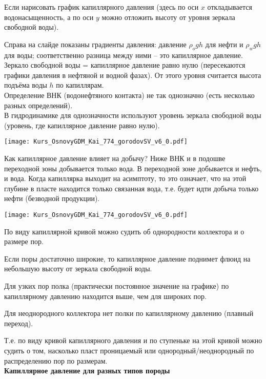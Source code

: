 Если нарисовать график капиллярного давления (здесь по оси $x$ откладывается водонасыщенность, а по оси $y$ можно отложить высоту от уровня зеркала свободной воды).

Справа на слайде показаны градиенты давления: давление $\rho_{o} g h$ для нефти и $\rho_{w} g h$ для воды; соответственно разница между ними -- это капиллярное давление.
\\

Зеркало свободной воды = капиллярное давление равно нулю (пересекаются графики давления в нефтяной и водной фазах).
От этого уровня считается высота подъёма воды $h$ по капиллярам.
\\

Определение ВНК (водонефтяного контакта) не так однозначно (есть несколько разных определений).
\\

В гидродинамике для однозначности используют уровень зеркала свободной воды (уровень, где капиллярное давление равно нулю).

\texttt{[image: Kurs\_OsnovyGDM\_Kai\_774\_gorodovSV\_v6\_0.pdf]}

Как капиллярное давление влияет на добычу?
Ниже ВНК и в подошве переходной зоны добывается только вода.
В переходной зоне добывается и нефть, и вода.
Когда капиллярка выходит на асимптоту, то это означает, что на этой глубине в пласте находится только связанная вода, т.е. будет идти добыча только нефти (безводной продукции).

\texttt{[image: Kurs\_OsnovyGDM\_Kai\_774\_gorodovSV\_v6\_0.pdf]}

По виду капиллярной кривой можно судить об однородности коллектора и о размере пор.

Если поры достаточно широкие, то капиллярное давление поднимет флюид на небольшую высоту от зеркала свободной воды.

Для узких пор полка (практически постоянное значение на графике) по капиллярному давлению находится выше, чем для широких пор.

Для неоднородного коллектора нет полки по капиллярному давлению (плавный переход).

Т.е. по виду кривой капиллярного давления и по ступеньке на этой кривой можно судить о том, насколько пласт проницаемый или однородный/неоднородный по распределению пор по размерам.
\\

\textbf{Капиллярное давление для разных типов породы}

